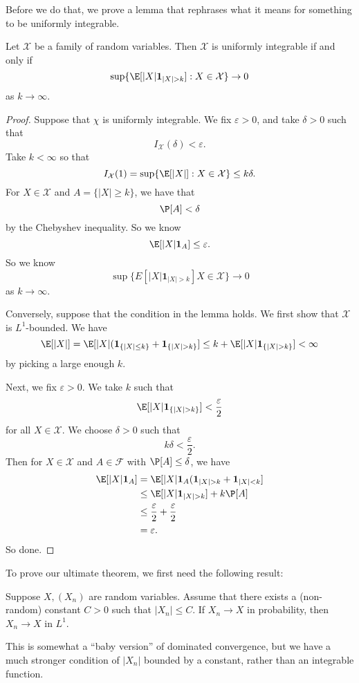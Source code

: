 \documentclass[a4paper]{article}
\begin{document}
Before we do that, we prove a lemma that rephrases what it means for something to be uniformly integrable.

\begin{lemma}
  Let $\mathcal{X}$ be a family of random variables. Then $\mathcal{X}$ is uniformly integrable if and only if
  \[
    \sup\{\E[|X|\mathbf{1}_{|X| > k}]: X \in \mathcal{X}\} \to 0
  \]
  as $k \to \infty$.
\end{lemma}

\begin{proof}
  Suppose that $\chi$ is uniformly integrable. We fix $\varepsilon > 0$, and take $\delta > 0$ such that
  \[
    I_\mathcal{X}(\delta) < \varepsilon.
  \]
  Take $k < \infty$ so that
  \[
    I_\mathcal{X}(1) = \sup\{\E[|X|]: X \in \mathcal{X}\} \leq k \delta.
  \]
  For $X \in \mathcal{X}$ and $A = \{|X| \geq k\}$, we have that
  \[
    \P[A] < \delta
  \]
  by the Chebyshev inequality. So we know
  \[
    \E[|X|\mathbf{1}_A] \leq \varepsilon.
  \]
  So we know
  \[
    \sup\{E[|X| \mathbf{1}_{|X| > k}] X \in \mathcal{X}\} \to 0
  \]
  as $k \to \infty$.

  Conversely, suppose that the condition in the lemma holds. We first show that $\mathcal{X}$ is $L^1$-bounded. We have
  \[
    \E[|X|] = \E[|X|(\mathbf{1}_{\{|X| \leq k\}} + \mathbf{1}_{\{|X| > k\}}] \leq k + \E[|X| \mathbf{1}_{\{|X| > k\}}] < \infty
  \]
  by picking a large enough $k$.

  Next, we fix $\varepsilon > 0$. We take $k$ such that
  \[
    \E[|X|\mathbf{1}_{\{|X| > k\}}] < \frac{\varepsilon}{2}
  \]
  for all $X \in \mathcal{X}$. We choose $\delta > 0$ such that
  \[
    k \delta < \frac{\varepsilon}{2}.
  \]
  Then for $X \in \mathcal{X}$ and $A \in \mathcal{F}$ with $\P[A] \leq \delta$, we have
  \begin{align*}
    \E[|X| \mathbf{1}_A] &= \E[|X|\mathbf{1}_A (\mathbf{1}_{|X| > k} + \mathbf{1}_{|X| < k}]\\
    &\leq \E[|X| \mathbf{1}_{|X| > k}] + k \P[A]\\
    &\leq \frac{\varepsilon}{2} + \frac{\varepsilon}{2}\\
    &= \varepsilon.
  \end{align*}
   So done.
\end{proof}

To prove our ultimate theorem, we first need the following result:
\begin{thm}
  Suppose $X, (X_n)$ are random variables. Assume that there exists a (non-random) constant $C > 0$ such that $|X_n| \leq C$. If $X_n \to X$ in probability, then $X_n \to X$ in $L^1$.
\end{thm}
This is somewhat a ``baby version'' of dominated convergence, but we have a much stronger condition of $|X_n|$ bounded by a constant, rather than an integrable function.
\end{document}
